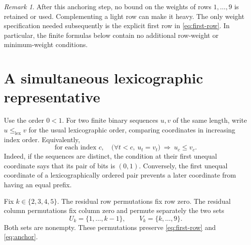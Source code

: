 \documentclass[11pt]{article}
\theoremstyle{definition}
\theoremstyle{remark}
\newtheorem{remark}[theorem]{Remark}
\newcommand{\lexle}{\leq_{\mathrm{lex}}}
\begin{document}
\begin{remark}
\label{rem:no-weight}
After this anchoring step, no bound on the weights of rows $1,\ldots,9$
is retained or used. Complementing a light row can make it heavy. The
only weight specification needed subsequently is the explicit first
row in \eqref{eq:first-row}. In particular, the finite formulas below
contain no additional row-weight or minimum-weight conditions.
\end{remark}

\section{A simultaneous lexicographic representative}
\label{sec:lex}

Use the order $0<1$. For two finite binary sequences $u,v$ of the same
length, write $u\lexle v$ for the usual lexicographic order, comparing
coordinates in increasing index order. Equivalently,
\begin{equation}
\label{eq:prefix-order}
 \text{for each index }c,\quad
 \bigl(\forall t<c,\ u_t=v_t\bigr)\ \Longrightarrow\ u_c\leq v_c.
\end{equation}
Indeed, if the sequences are distinct, the condition at their first
unequal coordinate says that its pair of bits is $(0,1)$. Conversely,
the first unequal coordinate of a lexicographically ordered pair
prevents a later coordinate from having an equal prefix.

Fix $k\in\{2,3,4,5\}$. The residual row permutations fix row zero.
The residual column permutations fix column zero and permute separately
the two sets
\begin{equation}
\label{eq:blocks}
 U_k=\{1,\ldots,k-1\},\qquad V_k=\{k,\ldots,9\}.
\end{equation}
Both sets are nonempty. These permutations preserve
\eqref{eq:first-row} and \eqref{eq:anchor}.
\end{document}
